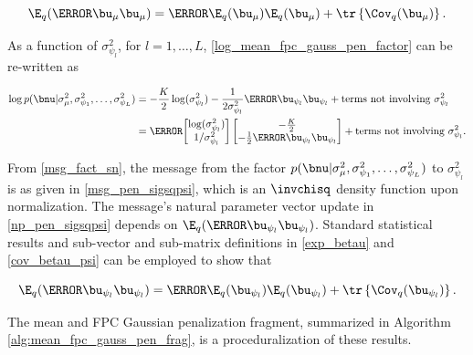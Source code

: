 \documentclass[12pt]{article}
\def\sigsqmu{\sigma^2_{\mu}}
\def\umu{\bu_\mu}
\newcommand\upsi[1]{\bu_{\psi_{#1}}}
\newcommand\sigsqpsi[1]{\sigma^2_{\psi_{#1}}}
\newcommand\tni[1]{\text{terms not involving $#1$}}
\theoremstyle{plain}
\theoremstyle{definition}
\theoremstyle{remark}
\begin{document}
\[
	\E_q (\T{\umu} \umu) = \T{\E_q (\umu)} \E_q (\umu) + \tr \left\{ \Cov_q (\umu) \right\}.
\]

As a function of $\sigsqpsi{l}$, for $l = 1, \dots, L$, \eqref{log_mean_fpc_gauss_pen_factor} can be re-written as

\begin{align*}
	\log p(\bnu | \sigsqmu, \sigsqpsi{1}, \dots, \sigsqpsi{L})
		& = -\frac{K}{2} \log (\sigsqpsi{l}) - \frac{1}{2\sigsqpsi{l}} \T{\upsi{l}} \upsi{l} + \tni{\sigsqpsi{l}} \\
		& = \T{\begin{bmatrix}
			\log (\sigsqpsi{l}) \\
			1/\sigsqpsi{l}
		\end{bmatrix}} \begin{bmatrix}
			-\frac{K}{2} \\
			-\frac12 \T{\upsi{l}} \upsi{l}
		\end{bmatrix} + \tni{\sigsqpsi{l}}.
\end{align*}

\noindent From \eqref{msg_fact_sn}, the message from the factor $p(\bnu | \sigsqmu, \sigsqpsi{1}, \dots,
\sigsqpsi{L})$ to $\sigsqpsi{l}$ is as given in \eqref{msg_pen_sigsqpsi}, which is an $\invchisq$
density function upon normalization. The message's natural parameter vector update in \eqref{np_pen_sigsqpsi}
depends on $\E_q (\T{\upsi{l}} \upsi{l})$. Standard statistical results and sub-vector and sub-matrix definitions in
\eqref{exp_betau} and \eqref{cov_betau_psi} can be employed to show that

\[
	\E_q (\T{\upsi{l}} \upsi{l}) = \T{\E_q (\upsi{l})} \E_q (\upsi{l}) + \tr \left\{ \Cov_q (\upsi{l}) \right\}.
\]

The mean and FPC Gaussian penalization fragment, summarized in Algorithm \ref{alg:mean_fpc_gauss_pen_frag},
is a proceduralization of these results.
\end{document}
